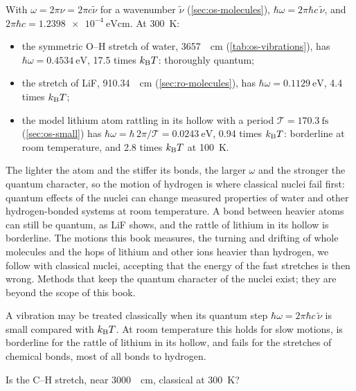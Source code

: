 With $\omega = 2\pi\nu = 2\pi c\tilde\nu$ for a wavenumber $\tilde\nu$
(\cref{sec:os-molecules}), $\hbar\omega = 2\pi\hbar c\,\tilde\nu$, and
$2\pi\hbar c = \SI{1.2398e-4}{\electronvolt\centi\metre}$. At \SI{300}{\kelvin}:
\begin{itemize}
\item the symmetric O--H stretch of water, \SI{3657}{\per\centi\metre}
   (\cref{tab:os-vibrations}), has $\hbar\omega = \SI{0.4534}{\electronvolt}$,
   17.5 times $k_{\mathrm{B}} T$: thoroughly quantum;
\item the stretch of LiF, \SI{910.34}{\per\centi\metre}
   (\cref{sec:ro-molecules}), has $\hbar\omega =
   \SI{0.1129}{\electronvolt}$, 4.4 times $k_{\mathrm{B}} T$;
\item the model lithium atom rattling in its hollow with a period
   $\mathcal{T} = \SI{170.3}{\femto\second}$ (\cref{sec:os-small}) has $\hbar\omega =
   \hbar\,2\pi/\mathcal{T} = \SI{0.0243}{\electronvolt}$, 0.94 times $k_{\mathrm{B}}
   T$: borderline at room temperature, and 2.8 times $k_{\mathrm{B}} T$ at
   \SI{100}{\kelvin}.
\end{itemize}
The lighter the atom and the stiffer its bonds, the larger $\omega$ and
the stronger the quantum character, so the motion of hydrogen is where
classical nuclei fail first: quantum effects of the nuclei can change
measured properties of water and other hydrogen-bonded systems at room
temperature\cite{MarklandCeriotti2018}. A bond between heavier atoms can
still be quantum, as LiF shows, and the rattle of lithium in its hollow
is borderline. The motions this book measures, the turning and drifting
of whole molecules and the hops of lithium and other ions heavier than
hydrogen, we follow with classical nuclei, accepting that the energy of
the fast stretches is then wrong.
Methods that keep the quantum character of the nuclei exist; they are
beyond the scope of this book.

\begin{keyidea}
A vibration may be treated classically when its quantum step
$\hbar\omega = 2\pi\hbar c\,\tilde\nu$ is small compared with $k_{\mathrm{B}} T$. At room
temperature this holds for slow motions, is borderline for the rattle of
lithium in its hollow, and fails for the stretches of chemical bonds,
most of all bonds to hydrogen.
\end{keyidea}

\begin{selfcheck}
Is the C--H stretch, near \SI{3000}{\per\centi\metre}, classical at
\SI{300}{\kelvin}?
\end{selfcheck}

